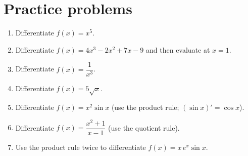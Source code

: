 \section*{Practice problems}
\begin{enumerate}[label=\textbf{\thechapter.\arabic*}]
  \item Differentiate $f(x)=x^5$.
  \item Differentiate $f(x)=4x^3-2x^2+7x-9$ and then evaluate at $x=1$.
  \item Differentiate $f(x)=\dfrac{1}{x^3}$.
  \item Differentiate $f(x)=5\sqrt{x}$.
  \item Differentiate $f(x)=x^2\sin x$ (use the product rule; $(\sin x)'=\cos x$).
  \item Differentiate $f(x)=\dfrac{x^2+1}{x-1}$ (use the quotient rule).
  \item[\textbf{3.7}$\star$] Use the product rule twice to differentiate $f(x)=x\,e^x\sin x$.
\end{enumerate}

